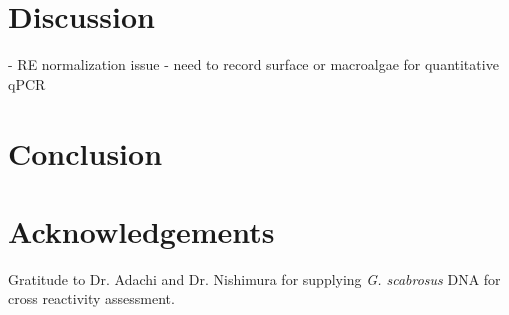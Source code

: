 \documentclass[12pt]{article}
\begin{document}
\newpage
\section{Discussion}
- RE normalization issue
- need to record surface or macroalgae for quantitative qPCR
\newpage
\section{Conclusion}

\section{Acknowledgements}
Gratitude to Dr. Adachi and Dr. Nishimura for supplying \emph{G. scabrosus} DNA for cross reactivity assessment.
\FloatBarrier
\newpage


\end{document}
